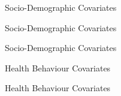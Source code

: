 \begin{frame}{Socio-Demographic Covariates}

    
\end{frame}
\begin{frame}{Socio-Demographic Covariates}

\end{frame}
\begin{frame}{Socio-Demographic Covariates}

\end{frame}

\begin{frame}{Health Behaviour Covariates}

\end{frame}
\begin{frame}{Health Behaviour Covariates}

\end{frame}